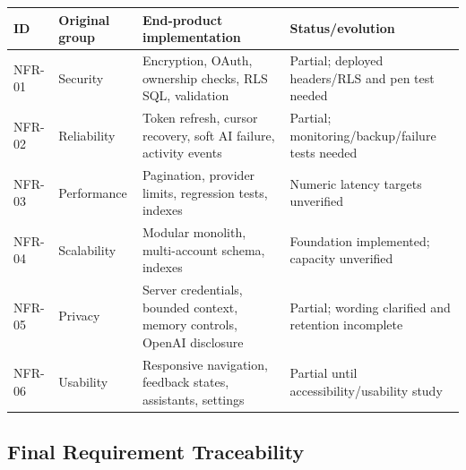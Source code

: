 \documentclass[
]{report}
\begin{document}
\begin{longtable}[]{@{}p{}p{}p{}p{}@{}}
\toprule\noalign{}
ID & Original group & End-product implementation & Status/evolution \\
\midrule\noalign{}
\endhead
\bottomrule\noalign{}
\endlastfoot
NFR-01 & Security & Encryption, OAuth, ownership checks, RLS SQL, validation & Partial; deployed headers/RLS and pen test needed \\
NFR-02 & Reliability & Token refresh, cursor recovery, soft AI failure, activity events & Partial; monitoring/backup/failure tests needed \\
NFR-03 & Performance & Pagination, provider limits, regression tests, indexes & Numeric latency targets unverified \\
NFR-04 & Scalability & Modular monolith, multi-account schema, indexes & Foundation implemented; capacity unverified \\
NFR-05 & Privacy & Server credentials, bounded context, memory controls, OpenAI disclosure & Partial; wording clarified and retention incomplete \\
NFR-06 & Usability & Responsive navigation, feedback states, assistants, settings & Partial until accessibility/usability study \\
\end{longtable}

\subsection{Final Requirement Traceability}
\end{document}
